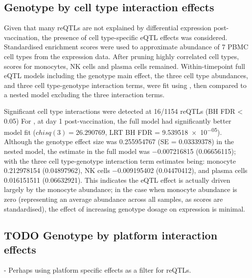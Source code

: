 \subsection{Genotype by cell type interaction effects}

Given that many \glspl{reQTL} are not explained by differential expression post-vaccination, the presence of cell type-specific \gls{eQTL} effects was considered.
Standardised  enrichment scores were used to approximate abundance of 7 \gls{PBMC} cell types from the expression data.
After pruning highly correlated cell types, scores for monocytes, \gls{NK} cells and plasma cells remained.
Within-timepoint full \gls{eQTL} models including the genotype main effect, the three cell type abundances, and three cell type-genotype interaction terms, were fit using , 
then compared to a nested model excluding the three interaction terms.

Significant cell type interactions were detected at 16/1154 \glspl{reQTL} (BH FDR < 0.05)
For , at day 1 post-vaccination, the full model had significantly better model fit ($chisq(3) = 26.290769$, \gls{LRT} BH FDR = \num{9.539518e-05}).
Although the genotype effect size was \num{0.255954767} (SE = \num{0.03339378}) in the nested model,
the estimate in the full model was \num{-0.007216815} (\num{0.06656115});
with the three cell type-genotype interaction term estimates being:
monocyte \num{0.212978154} (\num{0.04897962}),
\gls{NK} cells \num{-0.009195402} (\num{0.04470412}),
and plasma cells \num{0.016151511} (\num{0.06632921}).
This indicates the \gls{eQTL} effect is actually driven largely by the monocyte abundance;
in the case when monocyte abundance is zero (representing an average abundance across all samples, as scores are standardised), the effect of increasing genotype dosage on  expression is minimal.

\subsection{TODO Genotype by platform interaction effects}

%
- Perhaps using platform specific effects as a filter for reQTLs.

